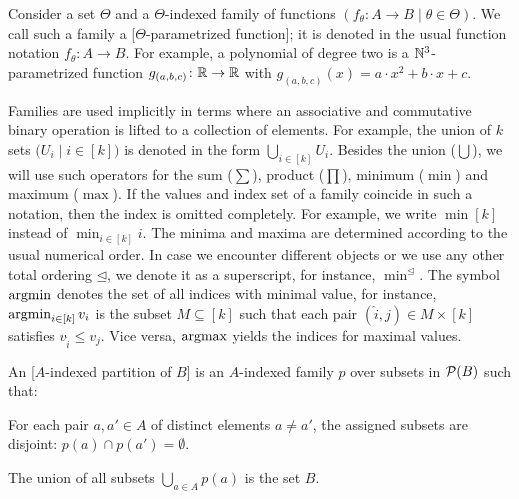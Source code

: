 \documentclass[../document.tex]{subfiles}
\begin{document}
    Consider a set \(\varTheta\) and a \(\varTheta\)-indexed family of functions \((f_\theta\colon A \to B\mid \theta \in \varTheta)\).
    We call such a family a [$\varTheta$-parametrized function]; it is denoted in the usual function notation \(f_\theta\colon A \to B\).
    For example, a polynomial of degree two is a \(\mathbb{N}^3\)-parametrized function \(g_{(a,b,c)}\colon \mathbb{R} \to \mathbb{R}\) with \(g_{(a,b,c)}(x) = a\cdot x^2 + b\cdot x + c\).

    Families are used implicitly in terms where an associative and commutative binary operation is lifted to a collection of elements.
    For example, the union of \(k\) sets \(\big(U_i \mid i \in [k]\big)\) is denoted in the form \(\bigcup_{i \in [k]} U_i\).
    Besides the union (\(\bigcup\)), we will use such operators for the sum (\(\sum\)), product (\(\prod\)), minimum (\(\min\)) and maximum (\(\max\)).
    If the values and index set of a family coincide in such a notation, then the index is omitted completely.
    For example, we write \(\min [k]\) instead of \(\min_{i \in [k]} i\).
    The minima and maxima are determined according to the usual numerical order.
    In case we encounter different objects or we use any other total ordering \(\unlhd\), we denote it as a superscript, for instance, \(\min^{\unlhd}\).
    The symbol \(\operatorname{arg min}\) denotes the set of all indices with minimal value, for instance, \(\operatorname{arg min}_{i \in [k]} v_i\) is the subset \(M \subseteq [k]\) such that each pair \((\hat{i}, j) \in M \times [k]\) satisfies \(v_{\hat{i}} \leq v_j\).
    Vice versa, \(\operatorname{arg max}\) yields the indices for maximal values.

    An [\(A\)-indexed partition of \(B\)] is an \(A\)-indexed family \(p\) over subsets in \(\mathcal{P}(B)\) such that:
    \begin{inparaenum}
        \item For each pair \(a, a' \in A\) of distinct elements \(a \neq a'\), the assigned subsets are disjoint: \(p(a) \cap p(a') = \emptyset\).
        \item The union of all subsets \(\bigcup_{a \in A} p(a)\) is the set \(B\).
    \end{inparaenum}
\end{document}
